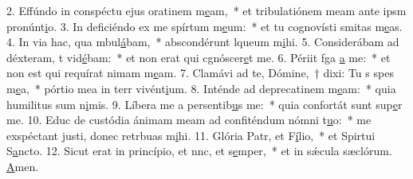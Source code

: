 2. Effúndo in conspéctu ejus oratinem m\uline{e}am,~* et tribulatiónem meam ante ipsm pronúnt\uline{i}o.
3. In deficiéndo ex me spírtum m\uline{e}um:~* et tu cognovísti smitas m\uline{e}as.
4. In via hac, qua mbul\uline{á}bam,~* abscondérunt lqueum m\uline{i}hi.
5. Considerábam ad déxteram, t vid\uline{é}bam:~* et non erat qui cgnóscer\uline{e}t me.
6. Périit fga \uline{a} me:~* et non est qui requírat nimam m\uline{e}am.
7. Clamávi ad te, Dómine,~† dixi: Tu s spes m\uline{e}a,~* pórtio mea in terr vivént\uline{i}um.
8. Inténde ad deprecatinem m\uline{e}am:~* quia humilitus sum n\uline{i}mis.
9. Líbera me a persentib\uline{u}s me:~* quia confortát sunt sup\uline{e}r me.
10. Educ de custódia ánimam meam ad confiténdum nómni t\uline{u}o:~* me exspéctant justi, donec retrbuas m\uline{i}hi.
11. Glória Patr, et F\uline{í}lio,~* et Spirtui S\uline{a}ncto.
12. Sicut erat in princípio, et nnc, et s\uline{e}mper,~* et in sǽcula sæclórum. \uline{A}men.
